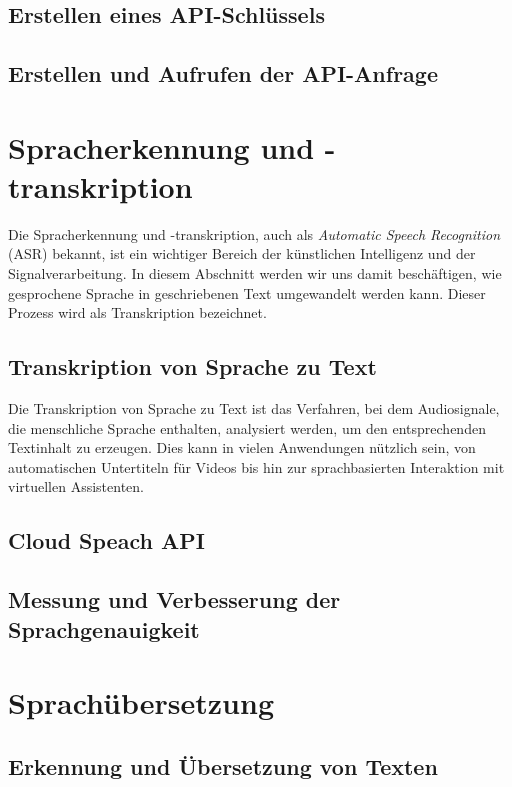 \documentclass[12pt,a4paper]{article}
\begin{document}
\subsection{Erstellen eines API-Schlüssels}
\subsection{Erstellen und Aufrufen der API-Anfrage}
\newpage


\section{Spracherkennung und -transkription}
Die Spracherkennung und -transkription, auch als \textit{Automatic Speech Recognition} (ASR) bekannt, ist ein wichtiger Bereich der künstlichen Intelligenz und der Signalverarbeitung. In diesem Abschnitt werden wir uns damit beschäftigen, wie gesprochene Sprache in geschriebenen Text umgewandelt werden kann. Dieser Prozess wird als Transkription bezeichnet.
\subsection{Transkription von Sprache zu Text}
Die Transkription von Sprache zu Text ist das Verfahren, bei dem Audiosignale, die menschliche Sprache enthalten, analysiert werden, um den entsprechenden Textinhalt zu erzeugen. Dies kann in vielen Anwendungen nützlich sein, von automatischen Untertiteln für Videos bis hin zur sprachbasierten Interaktion mit virtuellen Assistenten.


\subsection{Cloud Speach API}
\subsection{Messung und Verbesserung der Sprachgenauigkeit}




\newpage

\section{Sprachübersetzung}
\subsection{Erkennung und Übersetzung von Texten}

\newpage
\end{document}

